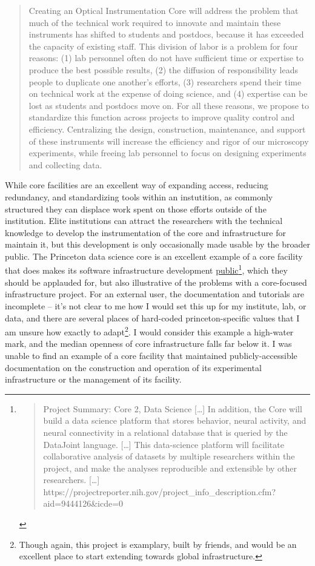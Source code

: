 \documentclass[10pt]{tufte-book}
\begin{document}
\begin{quote}
Creating an Optical Instrumentation Core will address the problem that
much of the technical work required to innovate and maintain these
instruments has shifted to students and postdocs, because it has
exceeded the capacity of existing staff. This division of labor is a
problem for four reasons: (1) lab personnel often do not have sufficient
time or expertise to produce the best possible results, (2) the
diffusion of responsibility leads people to duplicate one another's
efforts, (3) researchers spend their time on technical work at the
expense of doing science, and (4) expertise can be lost as students and
postdocs move on. For all these reasons, we propose to standardize this
function across projects to improve quality control and efficiency.
Centralizing the design, construction, maintenance, and support of these
instruments will increase the efficiency and rigor of our microscopy
experiments, while freeing lab personnel to focus on designing
experiments and collecting data.
\end{quote}

While core facilities are an excellent way of expanding access, reducing
redundancy, and standardizing tools within an instutition, as commonly
structured they can displace work spent on those efforts outside of the
institution. Elite institutions can attract the researchers with the
technical knowledge to develop the instrumentation of the core and
infrastructure for maintain it, but this development is only
occasionally made usable by the broader public. The Princeton data
science core is an excellent example of a core facility that does makes
its software infrastructure development
\href{https://github.com/BrainCOGS}{public}\footnote{\begin{quote}
  Project Summary: Core 2, Data Science {[}\ldots{]} In addition, the
  Core will build a data science platform that stores behavior, neural
  activity, and neural connectivity in a relational database that is
  queried by the DataJoint language. {[}\ldots{]} This data-science
  platform will facilitate collaborative analysis of datasets by
  multiple researchers within the project, and make the analyses
  reproducible and extensible by other researchers. {[}\ldots{]}
  https://projectreporter.nih.gov/project\_info\_description.cfm?aid=9444126\&icde=0
  \end{quote}}, which they should be applauded for, but also
illustrative of the problems with a core-focused infrastructure project.
For an external user, the documentation and tutorials are incomplete --
it's not clear to me how I would set this up for my institute, lab, or
data, and there are several places of hard-coded princeton-specific
values that I am unsure how exactly to adapt\footnote{Though again, this
  project is examplary, built by friends, and would be an excellent
  place to start extending towards global infrastructure.}. I would
consider this example a high-water mark, and the median openness of core
infrastructure falls far below it. I was unable to find an example of a
core facility that maintained publicly-accessible documentation on the
construction and operation of its experimental infrastructure or the
management of its facility.
\end{document}
